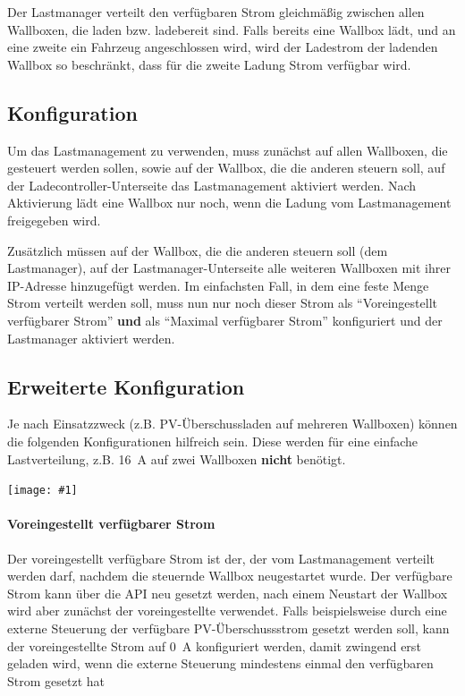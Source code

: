 \documentclass[a4paper,10pt]{article}
\newcommand{\gfx}[1]{\texttt{[image: \#1]}}
\begin{document}
\begin{multicols*}{2}
	Der Lastmanager verteilt den verfügbaren Strom gleichmäßig zwischen allen Wallboxen, die laden bzw. ladebereit sind.
	Falls bereits eine Wallbox lädt, und an eine zweite ein Fahrzeug angeschlossen wird,
	wird der Ladestrom der ladenden Wallbox so beschränkt, dass für die zweite Ladung Strom verfügbar wird.

	\subsection{Konfiguration}
	Um das Lastmanagement zu verwenden, muss zunächst auf allen Wallboxen, die gesteuert werden sollen,
	sowie auf der Wallbox, die die anderen steuern soll, auf der Ladecontroller-Unterseite
	das Lastmanagement aktiviert werden. Nach Aktivierung lädt eine Wallbox nur noch,
	wenn die Ladung vom Lastmanagement freigegeben wird.

	Zusätzlich müssen auf der Wallbox, die die anderen steuern soll (dem Lastmanager), auf der Lastmanager-Unterseite
	alle weiteren Wallboxen mit ihrer IP-Adresse hinzugefügt werden.
	Im einfachsten Fall, in dem eine feste Menge Strom verteilt werden soll, muss nun nur noch dieser
	Strom als \enquote{Voreingestellt verfügbarer Strom} \textbf{und} als \enquote{Maximal verfügbarer Strom}
	konfiguriert und der Lastmanager aktiviert werden.

	\subsection{Erweiterte Konfiguration}
	Je nach Einsatzzweck (z.B. PV-Überschussladen auf mehreren Wallboxen) können die folgenden Konfigurationen hilfreich sein.
	Diese werden für eine einfache Lastverteilung, z.B. \SI{16}{\ampere} auf zwei Wallboxen \textbf{nicht} benötigt.

	\gfx{./img_warp2/resized/web_charge_manager}

	\paragraph{Voreingestellt verfügbarer Strom}
	Der voreingestellt verfügbare Strom ist der, der vom Lastmanagement verteilt werden darf, nachdem die steuernde Wallbox
	neugestartet wurde. Der verfügbare Strom kann über die API neu gesetzt werden, nach einem Neustart der Wallbox wird aber
	zunächst der voreingestellte verwendet. Falls beispielsweise durch eine externe Steuerung der verfügbare PV-Überschussstrom
	gesetzt werden soll, kann der voreingestellte Strom auf \SI{0}{\ampere} konfiguriert werden, damit zwingend erst geladen wird,
	wenn die externe Steuerung mindestens einmal den verfügbaren Strom gesetzt hat


\end{multicols*}
\end{document}
